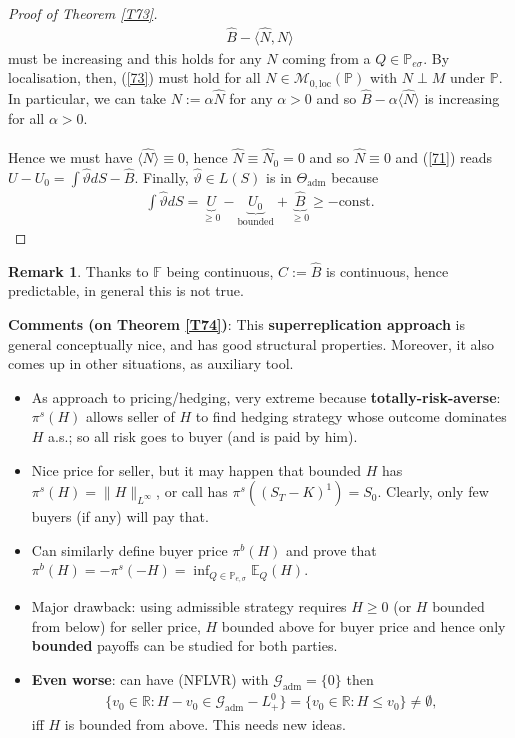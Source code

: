 \documentclass[12pt,a4paper, twoside]{article}
\theoremstyle{definition}
\newtheorem{rem}{Remark}[section]
\newcommand{\EE}{\mathbb{E}} %
\newcommand{\PP}{\mathbb{P}} %
\begin{document}
\begin{proof}[Proof of Theorem \ref{T73}]
\begin{align*} \label{73}
\hat{B}- \langle \hat{N}, N \rangle \tag{7.3}
\end{align*}
must be increasing and this holds for any $N$ coming from a $Q \in \mathbb{P}_{e \sigma}$. By localisation, then, (\ref{73}) must hold for all $N \in \mathcal{M}_{0, \text{loc}}( \PP)$ with $N \perp M$ under $\PP$. In particular, we can take $N:= \alpha \hat{N}$ for any $\alpha >0$ and so $\hat{B}- \alpha \langle \hat{N} \rangle$ is increasing for all $\alpha >0$. \\
\\
Hence we must have $\langle \hat{N} \rangle \equiv 0$, hence $\hat{N} \equiv \hat{N}_0 = 0$ and so $\hat{N} \equiv 0$ and (\ref{71}) reads $U-U_0 = \int \hat{\vartheta}dS - \hat{B}$. Finally, $\hat{\vartheta} \in L(S)$ is in $\Theta_\text{adm}$ because 
\begin{align*}
\int \hat{\vartheta}dS = \underbrace{U}_{ \geq 0}-\underbrace{U_0}_{ \text{bounded}} + \underbrace{\hat{B}}_{ \geq 0} \geq - \text{const}.
\end{align*}
\end{proof}
\begin{rem} Thanks to $\mathbb{F}$ being continuous, $C:= \hat{B}$ is continuous, hence predictable, in general this is not true. 
\end{rem}
\noindent \textbf{Comments (on Theorem \ref{T74})}: This \textbf{superreplication approach} is general conceptually nice, and has good structural properties. Moreover, it also comes up in other situations, as auxiliary tool.
\begin{itemize}
\item As approach to pricing/hedging, very extreme because \textbf{totally-risk-averse}: $\pi^s(H)$ allows seller of $H$ to find hedging strategy whose outcome dominates $H$ a.s.; so all risk goes to buyer (and is paid by him).
\item Nice price for seller, but it may happen that bounded $H$ has $\pi^s(H) = \| H \|_{L^\infty}$, or call has $\pi^s((S_T-K)^1) = S_0$. Clearly,  only few buyers (if any) will pay that. 
\item Can similarly define buyer price $\pi^b(H)$ and prove that $\pi^b(H) = - \pi^s(-H)= \inf_{Q \in \PP_{e, \sigma}} \EE_Q(H)$. 
\item Major drawback: using admissible strategy requires $H \geq 0$ (or $H$ bounded from below) for seller price, $H$ bounded above for buyer price and hence only \textbf{bounded} payoffs can be studied for both parties.
\item \textbf{Even worse}: can have (NFLVR) with $\mathcal{G}_\text{adm}= \{0\}$ then 
\begin{align*}
\{v_0 \in \mathbb{R}: H-v_0 \in \mathcal{G}_\text{adm}-L_+^0 \} = \{ v_0 \in \mathbb{R}: H \leq v_0 \} \neq \emptyset,
\end{align*}
iff $H$ is bounded from above. This needs new ideas. 
\end{itemize}
\end{document}
